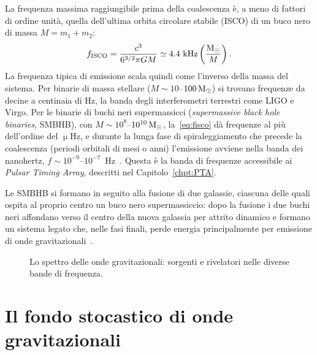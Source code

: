 La frequenza massima raggiungibile prima della coalescenza è, a meno di fattori di ordine unità, quella dell'ultima orbita circolare stabile (ISCO) di un buco nero di massa $M = m_1 + m_2$:
\begin{equation}
    f_{\mathrm{ISCO}} = \frac{c^3}{6^{3/2}\pi G M} \simeq 4.4\ \mathrm{kHz} \left(\frac{\mathrm{M}_\odot}{M}\right) .
    \label{eq:fisco}
\end{equation}
La frequenza tipica di emissione scala quindi come l'inverso della massa del sistema. Per binarie di massa stellare ($M \sim 10$--$100\,\mathrm{M}_\odot$) si trovano frequenze da decine a centinaia di Hz, la banda degli interferometri terrestri come LIGO e Virgo. Per le binarie di buchi neri supermassicci (\textit{supermassive black hole binaries}, SMBHB), con $M \sim 10^8$--$10^{10}\,\mathrm{M}_\odot$, la~\eqref{eq:fisco} dà frequenze al più dell'ordine del $\upmu$Hz, e durante la lunga fase di spiraleggiamento che precede la coalescenza (periodi orbitali di mesi o anni) l'emissione avviene nella banda dei nanohertz, $f \sim 10^{-9}$--$10^{-7}$~Hz~\cite{Taylor2021}. Questa è la banda di frequenze accessibile ai \textit{Pulsar Timing Array}, descritti nel Capitolo~\ref{chpt:PTA}.

Le SMBHB si formano in seguito alla fusione di due galassie, ciascuna delle quali ospita al proprio centro un buco nero supermassiccio: dopo la fusione i due buchi neri affondano verso il centro della nuova galassia per attrito dinamico e formano un sistema legato che, nelle fasi finali, perde energia principalmente per emissione di onde gravitazionali~\cite{Sesana2008, Taylor2021}.

\begin{figure}[h!]
    \centering
    \caption{\footnotesize Lo spettro delle onde gravitazionali: sorgenti e rivelatori nelle diverse bande di frequenza.}
    \label{fig:spettro_GW}
\end{figure}

\section{Il fondo stocastico di onde gravitazionali} \label{sec:GWB}

